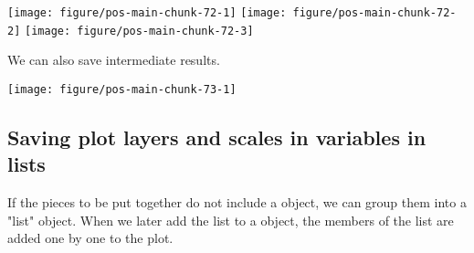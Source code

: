 \documentclass[krantz2]{krantz}\usepackage{knitr}%
\begin{document}
\begin{knitrout}\footnotesize
{}\color{fgcolor}\begin{kframe}
\begin{alltt}
 \hlopt{+}  \hlopt{+} \hlstd{(}\hlstd{)}
 \hlopt{+}  \hlopt{+} \hlstd{(}\hlstd{)} \hlopt{+} \hlstd{(}\hlstd{,} \hlstd{)}
\end{alltt}
\end{kframe}

{\centering \texttt{[image: figure/pos-main-chunk-72-1]} 
\texttt{[image: figure/pos-main-chunk-72-2]} 
\texttt{[image: figure/pos-main-chunk-72-3]} 

}



\end{knitrout}

We can also save intermediate results.

\begin{knitrout}\footnotesize
{}\color{fgcolor}\begin{kframe}
\begin{alltt}
 \hlkwb{<-}  \hlopt{+} \hlstd{(}\hlstd{=}\hlstd{(}\hlstd{,}\hlstd{))}
 \hlopt{+}  \hlopt{+} \hlstd{(}\hlstd{)}
\end{alltt}
\end{kframe}

{\centering \texttt{[image: figure/pos-main-chunk-73-1]} 

}



\end{knitrout}

\subsection{Saving plot layers and scales in variables in lists}

If the pieces to be put together do not include a  object, we can group them
into a "list" object. When we later add the list to a  object, the members of the list are added one by one to the plot.
\end{document}
